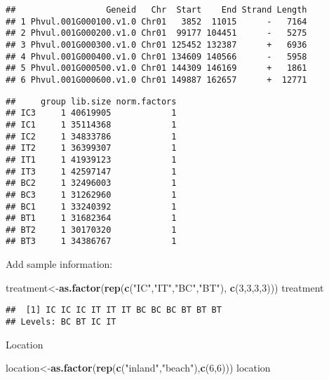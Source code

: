 \documentclass[
]{article}
\newenvironment{Shaded}{\begin{snugshade}}{\end{snugshade}}
\newcommand{\DecValTok}[1]{\textcolor[rgb]{0.00,0.00,0.81}{#1}}
\newcommand{\KeywordTok}[1]{\textcolor[rgb]{0.13,0.29,0.53}{\textbf{#1}}}
\newcommand{\NormalTok}[1]{#1}
\newcommand{\OperatorTok}[1]{\textcolor[rgb]{0.81,0.36,0.00}{\textbf{#1}}}
\newcommand{\StringTok}[1]{\textcolor[rgb]{0.31,0.60,0.02}{#1}}
\begin{document}
\begin{verbatim}
##                  Geneid   Chr  Start    End Strand Length
## 1 Phvul.001G000100.v1.0 Chr01   3852  11015      -   7164
## 2 Phvul.001G000200.v1.0 Chr01  99177 104451      -   5275
## 3 Phvul.001G000300.v1.0 Chr01 125452 132387      +   6936
## 4 Phvul.001G000400.v1.0 Chr01 134609 140566      -   5958
## 5 Phvul.001G000500.v1.0 Chr01 144309 146169      +   1861
## 6 Phvul.001G000600.v1.0 Chr01 149887 162657      +  12771
\end{verbatim}

\begin{Shaded}
\end{Shaded}

\begin{verbatim}
##     group lib.size norm.factors
## IC3     1 40619905            1
## IC1     1 35114368            1
## IC2     1 34833786            1
## IT2     1 36399307            1
## IT1     1 41939123            1
## IT3     1 42597147            1
## BC2     1 32496003            1
## BC3     1 31262960            1
## BC1     1 33240392            1
## BT1     1 31682364            1
## BT2     1 30170320            1
## BT3     1 34386767            1
\end{verbatim}

Add sample information:

\begin{Shaded}
\begin{Highlighting}[]
\NormalTok{treatment<-}\KeywordTok{as.factor}\NormalTok{(}\KeywordTok{rep}\NormalTok{(}\KeywordTok{c}\NormalTok{(}\StringTok{"IC"}\NormalTok{,}\StringTok{"IT"}\NormalTok{,}\StringTok{"BC"}\NormalTok{,}\StringTok{"BT"}\NormalTok{), }\KeywordTok{c}\NormalTok{(}\DecValTok{3}\NormalTok{,}\DecValTok{3}\NormalTok{,}\DecValTok{3}\NormalTok{,}\DecValTok{3}\NormalTok{)))}
\NormalTok{treatment }
\end{Highlighting}
\end{Shaded}

\begin{verbatim}
##  [1] IC IC IC IT IT IT BC BC BC BT BT BT
## Levels: BC BT IC IT
\end{verbatim}

Location

\begin{Shaded}
\begin{Highlighting}[]
\NormalTok{location<-}\KeywordTok{as.factor}\NormalTok{(}\KeywordTok{rep}\NormalTok{(}\KeywordTok{c}\NormalTok{(}\StringTok{"inland"}\NormalTok{,}\StringTok{"beach"}\NormalTok{),}\KeywordTok{c}\NormalTok{(}\DecValTok{6}\NormalTok{,}\DecValTok{6}\NormalTok{)))}
\NormalTok{location}
\end{Highlighting}
\end{Shaded}
\end{document}
